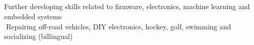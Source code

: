 \documentclass[mm]{res}
\begin{document}
\begin{resume}
%



\toprule
\section{\headinginterests}
\tb Further developing skills related to firmware, electronics, machine learning and embedded systems\\
􏰚\tb Repairing off-road vehicles, DIY electronics, hockey, golf, swimming and socializing (billingual)

\end{resume}
\end{document}
